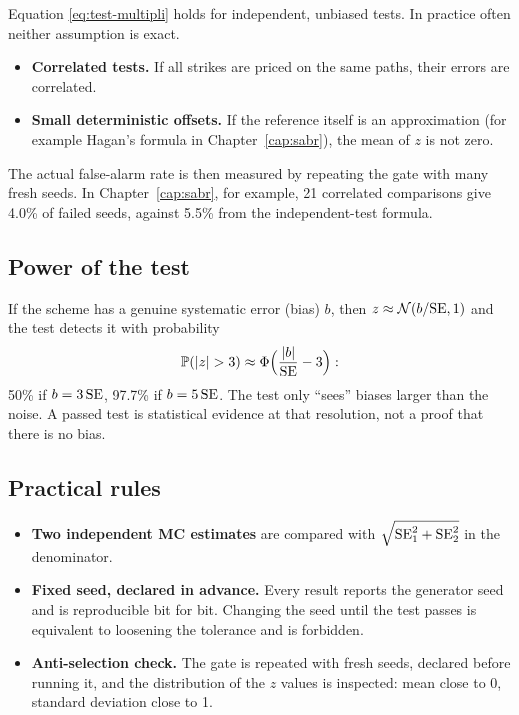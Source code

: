 Equation \eqref{eq:test-multipli} holds for independent, unbiased tests. In practice often neither assumption is
exact.
\begin{itemize}
\item \textbf{Correlated tests.} If all strikes are priced on the same paths, their errors are correlated.
\item \textbf{Small deterministic offsets.} If the reference itself is an approximation (for example Hagan's
formula in Chapter~\ref{cap:sabr}), the mean of $z$ is not zero.
\end{itemize}
The actual false-alarm rate is then measured by repeating the gate with many fresh seeds. In Chapter~\ref{cap:sabr},
for example, 21 correlated comparisons give 4.0\% of failed seeds, against 5.5\% from the independent-test formula.

\subsection{Power of the test}
If the scheme has a genuine systematic error (bias) $b$, then $z\approx\mathcal{N}(b/\mathrm{SE},1)$ and the test detects it with
probability
\begin{equation}\label{eq:potenza}
\PP(|z|>3)\approx\Phi\Big(\frac{|b|}{\SE}-3\Big):
\end{equation}
50\% if $b=3\,\mathrm{SE}$, 97.7\% if $b=5\,\mathrm{SE}$. The test only ``sees'' biases larger than the noise. A passed test is
statistical evidence at that resolution, not a proof that there is no bias.

\subsection{Practical rules}
\begin{itemize}
\item \textbf{Two independent MC estimates} are compared with $\sqrt{\mathrm{SE}_1^2+\mathrm{SE}_2^2}$ in the denominator.
\item \textbf{Fixed seed, declared in advance.} Every result reports the generator seed and is reproducible bit for
bit. Changing the seed until the test passes is equivalent to loosening the tolerance and is forbidden.
\item \textbf{Anti-selection check.} The gate is repeated with fresh seeds, declared before running it, and the
distribution of the $z$ values is inspected: mean close to 0, standard deviation close to 1.
\end{itemize}

